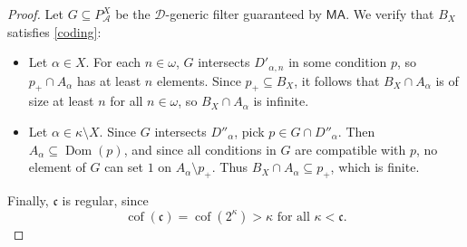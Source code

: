 \documentclass[12pt]{article}
\newcommand{\calA}{\mathcal{A}}
\newcommand{\calD}{\mathcal{D}}
\newcommand{\continuum}{\mathfrak{c}}
\newcommand{\cof}{\operatorname{cof}}
\newcommand{\dom}{\operatorname{Dom}}
\newcommand{\MA}{\mathsf{MA}}
\begin{document}
\begin{proof}
  Let $G \subseteq P_\calA^X$ be the $\calD$-generic filter guaranteed by $\MA$.
  We verify that $B_X$ satisfies \eqref{coding}:
  \begin{itemize}
    \item[$(\Rightarrow)$] 
      Let $\alpha \in X$. 
      For each $n \in \omega$, $G$ intersects $D'_{\alpha, n}$ in some condition $p$, so $p_+ \cap A_\alpha$ has at least $n$ elements.
      Since $p_+ \subseteq B_X$, it follows that $B_X \cap A_\alpha$ is of size at least $n$ for all $n \in \omega$, so $B_X \cap A_\alpha$ is infinite.
    \item[$(\Leftarrow)$] 
      Let $\alpha \in \kappa \setminus X$.
      Since $G$ intersects $D''_\alpha$, pick $p \in G \cap D''_\alpha$.
      Then $A_\alpha \subseteq \dom(p)$, and since all conditions in $G$ are compatible with $p$, no element of $G$ can set $1$ on $A_\alpha \setminus p_+$.
      Thus $B_X \cap A_\alpha \subseteq p_+$, which is finite.
  \end{itemize}

  Finally, $\continuum$ is regular, since
  \[
    \cof(\continuum) = \cof(2^\kappa) > \kappa \text{ for all } \kappa < \continuum.
  \]
\end{proof}
\end{document}
